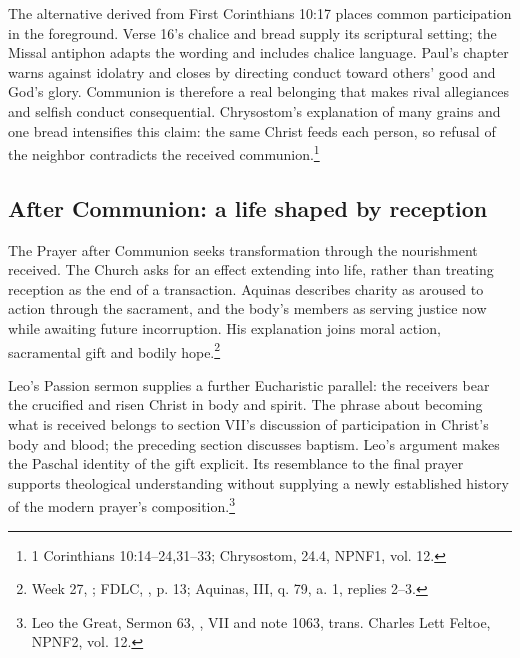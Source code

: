The alternative derived from First Corinthians 10:17 places common participation in the foreground. Verse 16's chalice and bread supply its scriptural setting; the Missal antiphon adapts the wording and includes chalice language. Paul's chapter warns against idolatry and closes by directing conduct toward others' good and God's glory. Communion is therefore a real belonging that makes rival allegiances and selfish conduct consequential. Chrysostom's explanation of many grains and one bread intensifies this claim: the same Christ feeds each person, so refusal of the neighbor contradicts the received communion.\footnote{1 Corinthians 10:14--24,31--33; Chrysostom,  24.4, NPNF1, vol. 12.}

\subsection{After Communion: a life shaped by reception}
The Prayer after Communion seeks transformation through the nourishment received. The Church asks for an effect extending into life, rather than treating reception as the end of a transaction. Aquinas describes charity as aroused to action through the sacrament, and the body's members as serving justice now while awaiting future incorruption. His explanation joins moral action, sacramental gift and bodily hope.\footnote{Week 27, ; FDLC, , p. 13; Aquinas, III, q. 79, a. 1, replies 2--3.}

Leo's Passion sermon supplies a further Eucharistic parallel: the receivers bear the crucified and risen Christ in body and spirit. The phrase about becoming what is received belongs to section VII's discussion of participation in Christ's body and blood; the preceding section discusses baptism. Leo's argument makes the Paschal identity of the gift explicit. Its resemblance to the final prayer supports theological understanding without supplying a newly established history of the modern prayer's composition.\footnote{Leo the Great, Sermon 63, , VII and note 1063, trans. Charles Lett Feltoe, NPNF2, vol. 12.}
